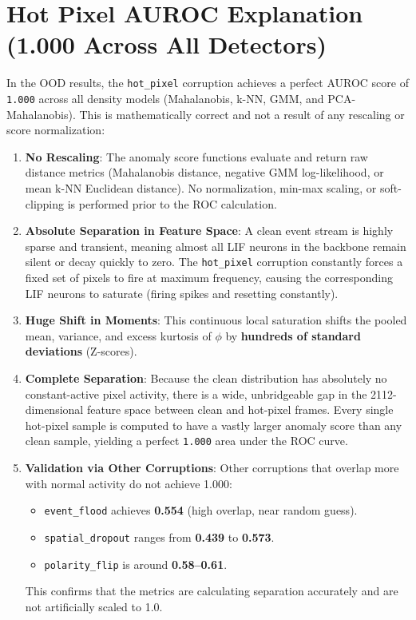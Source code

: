 \documentclass[11pt,a4paper]{article}
\begin{document}
\section{Hot Pixel AUROC Explanation (1.000 Across All Detectors)}
In the OOD results, the \texttt{hot\_pixel} corruption achieves a perfect AUROC score of \texttt{1.000} across all density models (Mahalanobis, k-NN, GMM, and PCA-Mahalanobis). This is mathematically correct and not a result of any rescaling or score normalization:
\begin{enumerate}
    \item \textbf{No Rescaling}: The anomaly score functions evaluate and return raw distance metrics (Mahalanobis distance, negative GMM log-likelihood, or mean k-NN Euclidean distance). No normalization, min-max scaling, or soft-clipping is performed prior to the ROC calculation.
    \item \textbf{Absolute Separation in Feature Space}: A clean event stream is highly sparse and transient, meaning almost all LIF neurons in the backbone remain silent or decay quickly to zero. The \texttt{hot\_pixel} corruption constantly forces a fixed set of pixels to fire at maximum frequency, causing the corresponding LIF neurons to saturate (firing spikes and resetting constantly).
    \item \textbf{Huge Shift in Moments}: This continuous local saturation shifts the pooled mean, variance, and excess kurtosis of $\phi$ by \textbf{hundreds of standard deviations} (Z-scores). 
    \item \textbf{Complete Separation}: Because the clean distribution has absolutely no constant-active pixel activity, there is a wide, unbridgeable gap in the 2112-dimensional feature space between clean and hot-pixel frames. Every single hot-pixel sample is computed to have a vastly larger anomaly score than any clean sample, yielding a perfect \texttt{1.000} area under the ROC curve.
    \item \textbf{Validation via Other Corruptions}: Other corruptions that overlap more with normal activity do not achieve 1.000:
    \begin{itemize}
        \item \texttt{event\_flood} achieves \textbf{0.554} (high overlap, near random guess).
        \item \texttt{spatial\_dropout} ranges from \textbf{0.439} to \textbf{0.573}.
        \item \texttt{polarity\_flip} is around \textbf{0.58--0.61}.
    \end{itemize}
    This confirms that the metrics are calculating separation accurately and are not artificially scaled to 1.0.
\end{enumerate}
\end{document}
